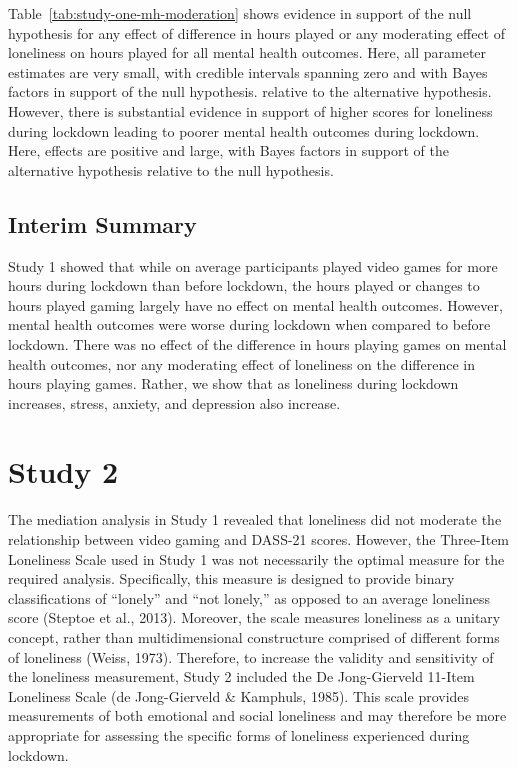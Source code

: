 \documentclass[
  english,
  man,floatsintext]{apa6}
\begin{document}
Table~\ref{tab:study-one-mh-moderation} shows evidence in support of the null hypothesis for any effect of difference in hours played or any moderating effect of loneliness on hours played for all mental health outcomes. Here, all parameter estimates are very small, with credible intervals spanning zero and with Bayes factors in support of the null hypothesis. relative to the alternative hypothesis. However, there is substantial evidence in support of higher scores for loneliness during lockdown leading to poorer mental health outcomes during lockdown. Here, effects are positive and large, with Bayes factors in support of the alternative hypothesis relative to the null hypothesis.

\hypertarget{interim-summary}{%
\subsection{Interim Summary}\label{interim-summary}}

Study 1 showed that while on average participants played video games for more hours during lockdown than before lockdown, the hours played or changes to hours played gaming largely have no effect on mental health outcomes. However, mental health outcomes were worse during lockdown when compared to before lockdown. There was no effect of the difference in hours playing games on mental health outcomes, nor any moderating effect of loneliness on the difference in hours playing games. Rather, we show that as loneliness during lockdown increases, stress, anxiety, and depression also increase.

\hypertarget{study-2}{%
\section{Study 2}\label{study-2}}

The mediation analysis in Study 1 revealed that loneliness did not moderate the relationship between video gaming and DASS-21 scores. However, the Three-Item Loneliness Scale used in Study 1 was not necessarily the optimal measure for the required analysis. Specifically, this measure is designed to provide binary classifications of ``lonely'' and ``not lonely,'' as opposed to an average loneliness score (Steptoe et al., 2013). Moreover, the scale measures loneliness as a unitary concept, rather than multidimensional constructure comprised of different forms of loneliness (Weiss, 1973). Therefore, to increase the validity and sensitivity of the loneliness measurement, Study 2 included the De Jong-Gierveld 11-Item Loneliness Scale (de Jong-Gierveld \& Kamphuls, 1985). This scale provides measurements of both emotional and social loneliness and may therefore be more appropriate for assessing the specific forms of loneliness experienced during lockdown.
\end{document}
